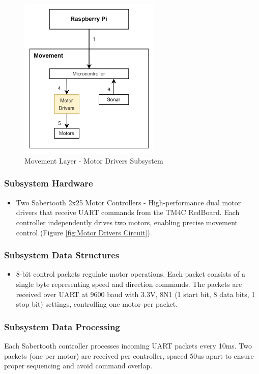 \begin{figure}[h!]
	\centering
 	\includegraphics[width=0.60\textwidth]{images/movement/2_motordriver.jpg}
 \caption{Movement Layer - Motor Drivers Subsystem}
\end{figure}

\subsubsection{Subsystem Hardware}
\begin{itemize}
    \item Two Sabertooth 2x25 Motor Controllers - High-performance dual motor drivers that receive UART commands from the TM4C RedBoard. Each controller independently drives two motors, enabling precise movement control (Figure \ref{fig:Motor Drivers Circuit}).
\end{itemize}

\subsubsection{Subsystem Data Structures}
\begin{itemize}
    \item 8-bit control packets regulate motor operations. Each packet consists of a single byte representing speed and direction commands. The packets are received over UART at 9600 baud with 3.3V, 8N1 (1 start bit, 8 data bits, 1 stop bit) settings, controlling one motor per packet.
\end{itemize}

\subsubsection{Subsystem Data Processing}
Each Sabertooth controller processes incoming UART packets every 10ms. Two packets (one per motor) are received per controller, spaced 50us apart to ensure proper sequencing and avoid command overlap.
\newpage



